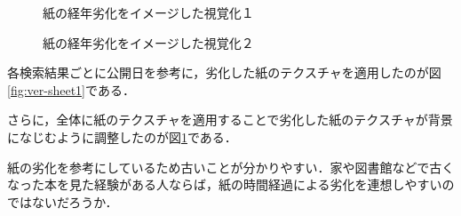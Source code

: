 \begin{figure}[htbp]
  \begin{minipage}{0.5\hsize}
    \begin{center}
    \end{center}
    \caption{紙の経年劣化をイメージした視覚化１}
    \label{fig:ver-sheet1}
  \end{minipage}
  \begin{minipage}{0.5\hsize}
    \begin{center}
    \end{center}
    \caption{紙の経年劣化をイメージした視覚化２}
    \label{fig:ver-sheet2}
  \end{minipage}
\end{figure}

各検索結果ごとに公開日を参考に，劣化した紙のテクスチャを適用したのが図\ref{fig:ver-sheet1}である．

さらに，全体に紙のテクスチャを適用することで劣化した紙のテクスチャが背景になじむように調整したのが図\ref{fig:ver-sheet2}である．

紙の劣化を参考にしているため古いことが分かりやすい．家や図書館などで古くなった本を見た経験がある人ならば，紙の時間経過による劣化を連想しやすいのではないだろうか．

